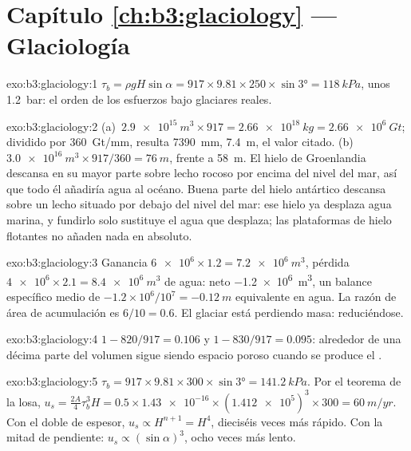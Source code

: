 \section*{Capítulo \ref{ch:b3:glaciology} --- Glaciología}

\begin{solution}{exo:b3:glaciology:1}
$\tau_b = \rho gH\sin\alpha = 917\times9.81\times250\times\sin\ang{3} =
\qty{118}{kPa}$, unos \qty{1.2}{bar}: el orden de los esfuerzos bajo
glaciares reales.
\end{solution}

\begin{solution}{exo:b3:glaciology:2}
(a)~$\qty{2.9e15}{m^3}\times917 = \qty{2.66e18}{kg} = \qty{2.66e6}{Gt}$;
dividido por \qty{360}{Gt/mm}, resulta \qty{7390}{mm}, \qty{7.4}{m}, el valor citado.
(b)~$\qty{3.0e16}{m^3}\times917/360 = \qty{76}{m}$, frente a \qty{58}{m}.
El hielo de Groenlandia descansa en su mayor parte sobre lecho rocoso por encima del nivel del mar, así que todo él
añadiría agua al océano. Buena parte del hielo antártico descansa sobre un lecho
situado por debajo del nivel del mar: ese hielo ya desplaza agua marina, y fundirlo solo sustituye
el agua que desplaza; las plataformas de hielo flotantes no añaden nada en absoluto.
\end{solution}

\begin{solution}{exo:b3:glaciology:3}
Ganancia $\num{6e6}\times1.2 = \qty{7.2e6}{m^3}$, pérdida $\num{4e6}\times2.1 =
\qty{8.4e6}{m^3}$ de agua: neto \qty{-1.2e6}{m^3}, un balance específico medio
de $-1.2\times10^6/10^7 = \qty{-0.12}{m}$ equivalente en agua. La
razón de área de acumulación es $6/10 = 0.6$. El glaciar está perdiendo masa:
reduciéndose.
\end{solution}

\begin{solution}{exo:b3:glaciology:4}
$1 - 820/917 = \num{0.106}$ y $1 - 830/917 = \num{0.095}$: alrededor de una décima
parte del volumen sigue siendo espacio poroso cuando se produce el .
\end{solution}

\begin{solution}{exo:b3:glaciology:5}
$\tau_b = 917\times9.81\times300\times\sin\ang{3} = \qty{141.2}{kPa}$. Por
el teorema de la losa, $u_s = \tfrac{2A}{4}\tau_b^3H = 0.5\times\num{1.43e-16}
\times(\num{1.412e5})^3\times300 = \qty{60}{m/yr}$. Con el doble de espesor, $u_s
\propto H^{n+1} = H^4$, dieciséis veces más rápido. Con la mitad de pendiente: $u_s \propto
(\sin\alpha)^3$, ocho veces más lento.
\end{solution}

